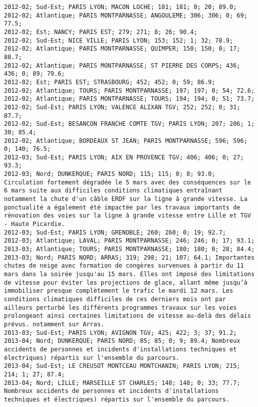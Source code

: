 \documentclass{article}
\begin{document}
\begin{Verbatim}[commandchars=\\\{\}]
2012-02; Sud-Est; PARIS LYON; MACON LOCHE; 181; 181; 0; 20; 89.0; 
2012-02; Atlantique; PARIS MONTPARNASSE; ANGOULEME; 306; 306; 0; 69; 77.5; 
2012-02; Est; NANCY; PARIS EST; 279; 271; 8; 26; 90.4; 
2012-02; Sud-Est; NICE VILLE; PARIS LYON; 153; 152; 1; 32; 78.9; 
2012-02; Atlantique; PARIS MONTPARNASSE; QUIMPER; 150; 150; 0; 17; 88.7; 
2012-02; Atlantique; PARIS MONTPARNASSE; ST PIERRE DES CORPS; 436; 436; 0; 89; 79.6; 
2012-02; Est; PARIS EST; STRASBOURG; 452; 452; 0; 59; 86.9; 
2012-02; Atlantique; TOURS; PARIS MONTPARNASSE; 197; 197; 0; 54; 72.6; 
2012-02; Atlantique; PARIS MONTPARNASSE; TOURS; 194; 194; 0; 51; 73.7; 
2012-02; Sud-Est; PARIS LYON; VALENCE ALIXAN TGV; 252; 252; 0; 31; 87.7; 
2012-02; Sud-Est; BESANCON FRANCHE COMTE TGV; PARIS LYON; 207; 206; 1; 30; 85.4; 
2012-02; Atlantique; BORDEAUX ST JEAN; PARIS MONTPARNASSE; 596; 596; 0; 140; 76.5; 
2012-03; Sud-Est; PARIS LYON; AIX EN PROVENCE TGV; 406; 406; 0; 27; 93.3; 
2012-03; Nord; DUNKERQUE; PARIS NORD; 115; 115; 0; 8; 93.0; Circulation fortement dégradée le 5 mars avec des conséquences sur le 6 mars suite aux difficiles conditions climatiques entraînant notamment la chute d'un câble ERDF sur la ligne à grande vitesse. La ponctualité a également été impactée par les travaux importants de rénovation des voies sur la ligne à grande vitesse entre Lille et TGV - Haute Picardie.
2012-03; Sud-Est; PARIS LYON; GRENOBLE; 260; 260; 0; 19; 92.7; 
2012-03; Atlantique; LAVAL; PARIS MONTPARNASSE; 246; 246; 0; 17; 93.1; 
2013-03; Atlantique; TOURS; PARIS MONTPARNASSE; 180; 180; 0; 28; 84.4; 
2013-03; Nord; PARIS NORD; ARRAS; 319; 298; 21; 107; 64.1; Importantes chutes de neige avec formation de congères survenues à partir du 11 mars dans la soirée jusqu'au 15 mars. Elles ont imposé des limitations de vitesse pour éviter les projections de glace, allant même jusqu’à immobiliser presque complètement le trafic le mardi 12 mars. Les conditions climatiques difficiles de ces derniers mois ont par ailleurs perturbé les différents programmes travaux sur les voies prolongeant ainsi certaines limitations de vitesse au-delà des délais prévus. notamment sur Arras.
2013-03; Sud-Est; PARIS LYON; AVIGNON TGV; 425; 422; 3; 37; 91.2; 
2013-04; Nord; DUNKERQUE; PARIS NORD; 85; 85; 0; 9; 89.4; Nombreux accidents de personnes et incidents d'installations techniques et électriques) répartis sur l'ensemble du parcours.
2013-04; Sud-Est; LE CREUSOT MONTCEAU MONTCHANIN; PARIS LYON; 215; 214; 1; 27; 87.4; 
2013-04; Nord; LILLE; MARSEILLE ST CHARLES; 148; 148; 0; 33; 77.7; Nombreux accidents de personnes et incidents d'installations techniques et électriques) répartis sur l'ensemble du parcours.

\end{Verbatim}
\end{document}
